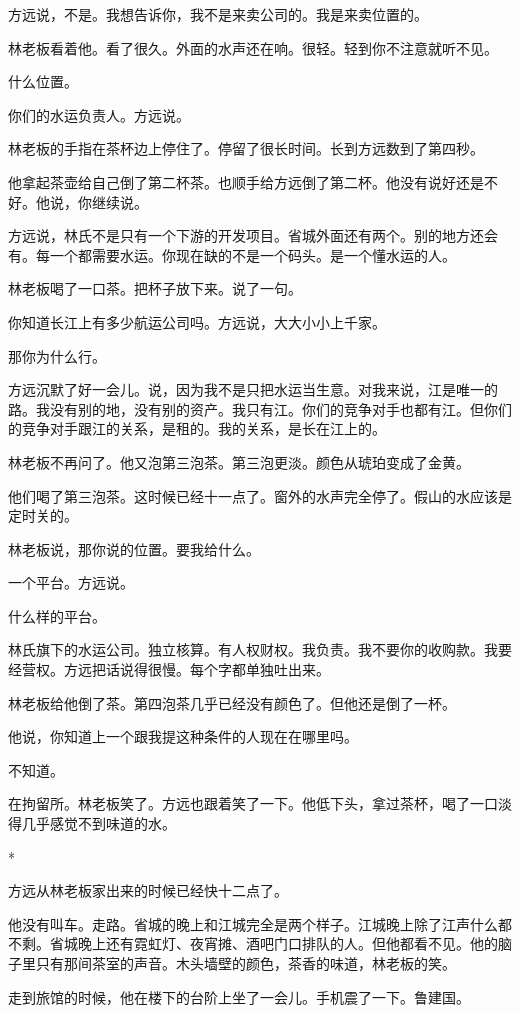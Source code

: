 \documentclass[UTF8,a5paper,11pt,openany]{ctexbook}
\newcommand{\scene}{\vspace{1em}\begin{center}*\quad*\quad*\end{center}\vspace{0.5em}}
\begin{document}
方远说，不是。我想告诉你，我不是来卖公司的。我是来卖位置的。

林老板看着他。看了很久。外面的水声还在响。很轻。轻到你不注意就听不见。

什么位置。

你们的水运负责人。方远说。

林老板的手指在茶杯边上停住了。停留了很长时间。长到方远数到了第四秒。

他拿起茶壶给自己倒了第二杯茶。也顺手给方远倒了第二杯。他没有说好还是不好。他说，你继续说。

方远说，林氏不是只有一个下游的开发项目。省城外面还有两个。别的地方还会有。每一个都需要水运。你现在缺的不是一个码头。是一个懂水运的人。

林老板喝了一口茶。把杯子放下来。说了一句。

你知道长江上有多少航运公司吗。方远说，大大小小上千家。

那你为什么行。

方远沉默了好一会儿。说，因为我不是只把水运当生意。对我来说，江是唯一的路。我没有别的地，没有别的资产。我只有江。你们的竞争对手也都有江。但你们的竞争对手跟江的关系，是租的。我的关系，是长在江上的。

林老板不再问了。他又泡第三泡茶。第三泡更淡。颜色从琥珀变成了金黄。

他们喝了第三泡茶。这时候已经十一点了。窗外的水声完全停了。假山的水应该是定时关的。

林老板说，那你说的位置。要我给什么。

一个平台。方远说。

什么样的平台。

林氏旗下的水运公司。独立核算。有人权财权。我负责。我不要你的收购款。我要经营权。方远把话说得很慢。每个字都单独吐出来。

林老板给他倒了茶。第四泡茶几乎已经没有颜色了。但他还是倒了一杯。

他说，你知道上一个跟我提这种条件的人现在在哪里吗。

不知道。

在拘留所。林老板笑了。方远也跟着笑了一下。他低下头，拿过茶杯，喝了一口淡得几乎感觉不到味道的水。


\scene

方远从林老板家出来的时候已经快十二点了。

他没有叫车。走路。省城的晚上和江城完全是两个样子。江城晚上除了江声什么都不剩。省城晚上还有霓虹灯、夜宵摊、酒吧门口排队的人。但他都看不见。他的脑子里只有那间茶室的声音。木头墙壁的颜色，茶香的味道，林老板的笑。

走到旅馆的时候，他在楼下的台阶上坐了一会儿。手机震了一下。鲁建国。
\end{document}
